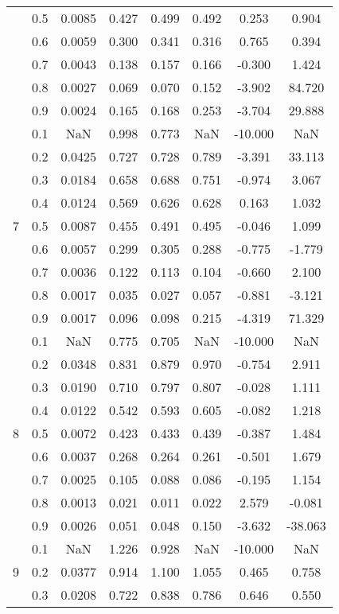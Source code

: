 \documentclass[11pt,a4paper]{report}
\begin{document}
\begin{longtable}{ | c | c || c | c | c | c | c | c | }
 & 0.5 & 0.0085 & 0.427 & 0.499 & 0.492 & 0.253 & 0.904 \\
 & 0.6 & 0.0059 & 0.300 & 0.341 & 0.316 & 0.765 & 0.394 \\
 & 0.7 & 0.0043 & 0.138 & 0.157 & 0.166 & -0.300 & 1.424 \\
 & 0.8 & 0.0027 & 0.069 & 0.070 & 0.152 & -3.902 & 84.720 \\
 & 0.9 & 0.0024 & 0.165 & 0.168 & 0.253 & -3.704 & 29.888 \\
 \hline
\multirow{9}{*}{7} & 0.1 & NaN & 0.998 & 0.773 & NaN & -10.000 & NaN \\
 & 0.2 & 0.0425 & 0.727 & 0.728 & 0.789 & -3.391 & 33.113 \\
 & 0.3 & 0.0184 & 0.658 & 0.688 & 0.751 & -0.974 & 3.067 \\
 & 0.4 & 0.0124 & 0.569 & 0.626 & 0.628 & 0.163 & 1.032 \\
 & 0.5 & 0.0087 & 0.455 & 0.491 & 0.495 & -0.046 & 1.099 \\
 & 0.6 & 0.0057 & 0.299 & 0.305 & 0.288 & -0.775 & -1.779 \\
 & 0.7 & 0.0036 & 0.122 & 0.113 & 0.104 & -0.660 & 2.100 \\
 & 0.8 & 0.0017 & 0.035 & 0.027 & 0.057 & -0.881 & -3.121 \\
 & 0.9 & 0.0017 & 0.096 & 0.098 & 0.215 & -4.319 & 71.329 \\
 \hline
\multirow{9}{*}{8} & 0.1 & NaN & 0.775 & 0.705 & NaN & -10.000 & NaN \\
 & 0.2 & 0.0348 & 0.831 & 0.879 & 0.970 & -0.754 & 2.911 \\
 & 0.3 & 0.0190 & 0.710 & 0.797 & 0.807 & -0.028 & 1.111 \\
 & 0.4 & 0.0122 & 0.542 & 0.593 & 0.605 & -0.082 & 1.218 \\
 & 0.5 & 0.0072 & 0.423 & 0.433 & 0.439 & -0.387 & 1.484 \\
 & 0.6 & 0.0037 & 0.268 & 0.264 & 0.261 & -0.501 & 1.679 \\
 & 0.7 & 0.0025 & 0.105 & 0.088 & 0.086 & -0.195 & 1.154 \\
 & 0.8 & 0.0013 & 0.021 & 0.011 & 0.022 & 2.579 & -0.081 \\
 & 0.9 & 0.0026 & 0.051 & 0.048 & 0.150 & -3.632 & -38.063 \\
 \hline
\multirow{9}{*}{9} & 0.1 & NaN & 1.226 & 0.928 & NaN & -10.000 & NaN \\
 & 0.2 & 0.0377 & 0.914 & 1.100 & 1.055 & 0.465 & 0.758 \\
 & 0.3 & 0.0208 & 0.722 & 0.838 & 0.786 & 0.646 & 0.550 \\

\end{longtable}
\end{document}
